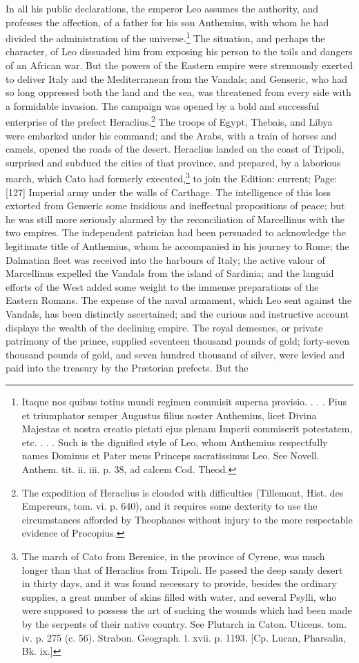 In all his public declarations, the emperor Leo assumes the authority, and professes the affection, of a father for his son Anthemius, with whom he had divided the administration of the universe.\footnote{Itaque nos quibus totius mundi regimen commisit superna provisio. . . . Pius et triumphator semper Augustus filius noster Anthemius, licet Divina Majestas et nostra creatio pietati ejus plenam Imperii commiserit potestatem, etc. . . . Such is the dignified style of Leo, whom Anthemius respectfully names Dominus et Pater meus Princeps sacratissimus Leo. See Novell. Anthem. tit. ii. iii. p. 38, ad calcem Cod. Theod.} The situation, and perhaps the character, of Leo dissuaded him from exposing his person to the toils and dangers of an African war. But the powers of the Eastern empire were strenuously exerted to deliver Italy and the Mediterranean from the Vandals; and Genseric, who had so long oppressed both the land and the sea, was threatened from every side with a formidable invasion. The campaign was opened by a bold and successful enterprise of the prefect Heraclius.\footnote{The expedition of Heraclius is clouded with difficulties (Tillemont, Hist. des Empereurs, tom. vi. p. 640), and it requires some dexterity to use the circumstances afforded by Theophanes without injury to the more respectable evidence of Procopius.} The troops of Egypt, Thebais, and Libya were embarked under his command; and the Arabs, with a train of horses and camels, opened the roads of the desert. Heraclius landed on the coast of Tripoli, surprised and subdued the cities of that province, and prepared, by a laborious march, which Cato had formerly executed,\footnote{The march of Cato from Berenice, in the province of Cyrene, was much longer than that of Heraclius from Tripoli. He passed the deep sandy desert in thirty days, and it was found necessary to provide, besides the ordinary supplies, a great number of skins filled with water, and several Psylli, who were supposed to possess the art of sucking the wounds which had been made by the serpents of their native country. See Plutarch in Caton. Uticens. tom. iv. p. 275 (c. 56). Strabon. Geograph. l. xvii. p. 1193. [Cp. Lucan, Pharsalia, Bk. ix.]} to join the Edition: current; Page: [127] Imperial army under the walls of Carthage. The intelligence of this loss extorted from Genseric some insidious and ineffectual propositions of peace; but he was still more seriously alarmed by the reconciliation of Marcellinus with the two empires. The independent patrician had been persuaded to acknowledge the legitimate title of Anthemius, whom he accompanied in his journey to Rome; the Dalmatian fleet was received into the harbours of Italy; the active valour of Marcellinus expelled the Vandals from the island of Sardinia; and the languid efforts of the West added some weight to the immense preparations of the Eastern Romans. The expense of the naval armament, which Leo sent against the Vandals, has been distinctly ascertained; and the curious and instructive account displays the wealth of the declining empire. The royal demesnes, or private patrimony of the prince, supplied seventeen thousand pounds of gold; forty-seven thousand pounds of gold, and seven hundred thousand of silver, were levied and paid into the treasury by the Prætorian prefects. But the 